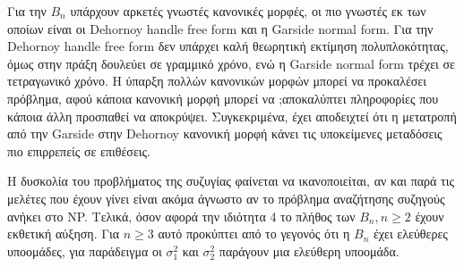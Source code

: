  Για την $ B_n $ υπάρχουν αρκετές γνωστές κανονικές μορφές, οι πιο γνωστές εκ των οποίων είναι οι Dehornoy handle free form και η Garside normal form. 
Για την Dehornoy handle free form  δεν υπάρχει καλή θεωρητική εκτίμηση πολυπλοκότητας, όμως στην πράξη δουλεύει σε γραμμικό χρόνο, ενώ η Garside normal form τρέχει σε τετραγωνικό χρόνο.
H  ύπαρξη πολλών κανονικών μορφών μπορεί να προκαλέσει πρόβλημα, αφού κάποια κανονική μορφή μπορεί να ;αποκαλύπτει πληροφορίες που κάποια άλλη προσπαθεί να αποκρύψει. Συγκεκριμένα, έχει αποδειχτεί ότι η μετατροπή από την Garside στην Dehornoy κανονική μορφή κάνει τις υποκείμενες μεταδόσεις πιο επιρρεπείς σε επιθέσεις.

Η δυσκολία του προβλήματος της συζυγίας φαίνεται να ικανοποιείται, αν και παρά τις μελέτες που έχουν γίνει είναι ακόμα άγνωστο αν το πρόβλημα αναζήτησης συζηγούς ανήκει στο NP.
Τελικά, όσον αφορά την ιδιότητα 4 το πλήθος των $ B_n, n\geq 2 $ έχουν εκθετική αύξηση. Για $ n\geq 3 $ αυτό προκύπτει από το γεγονός ότι η $ B_n $ έχει ελεύθερες υποομάδες, για παράδειγμα οι $ \sigma_1^2 $ και $ \sigma_2^2 $ παράγουν μια ελεύθερη υποομάδα.

